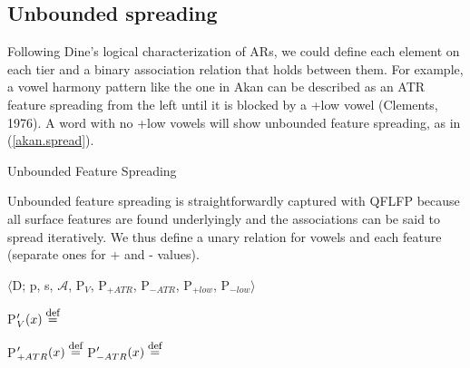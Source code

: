 \documentclass[,doc,floatsintext]{apa6}
\def\defeq{\mathrel{\buildrel \mbox{\footnotesize def} \over =}}
\theoremstyle{definition}
\theoremstyle{definition}
\theoremstyle{definition}
\theoremstyle{remark}
\begin{document}
\subsection{Unbounded spreading}\label{unbounded-spreading}

Following Dine's logical characterization of ARs, we could define each
element on each tier and a binary association relation that holds
between them. For example, a vowel harmony pattern like the one in Akan
can be described as an ATR feature spreading from the left until it is
blocked by a +low vowel (Clements, 1976). A word with no +low vowels
will show unbounded feature spreading, as in (\ref{akan.spread}).

\begin{exe}
\ex \label{akan.spread} Unbounded Feature Spreading \\
\end{exe}

\noindent Unbounded feature spreading is straightforwardly captured with
QFLFP because all surface features are found underlyingly and the
associations can be said to spread iteratively. We thus define a unary
relation for vowels and each feature (separate ones for + and - values).

\newpage

\begin{exe}
\ex\label{qflfp.spread} $\langle$D; p, s, $\mathcal{A}$, P$_V$, P$_{+ATR}$, P$_{-ATR}$, P$_{+low}$, P$_{-low}\rangle$ 
\end{exe}

P\('_{V}(x) \defeq\) \vspace{0.5in}

P\('_{+ATR}(x) \defeq\) \hspace{2.25in} P\('_{-ATR}(x) \defeq\)
\vspace{0.5in}
\end{document}
